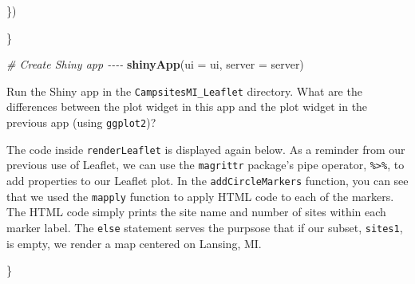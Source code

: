\documentclass[
]{krantz}
\newenvironment{Shaded}{\begin{snugshade}}{\end{snugshade}}
\newcommand{\CommentTok}[1]{\textcolor[rgb]{0.56,0.35,0.01}{\textit{#1}}}
\newcommand{\DataTypeTok}[1]{\textcolor[rgb]{0.13,0.29,0.53}{#1}}
\newcommand{\KeywordTok}[1]{\textcolor[rgb]{0.13,0.29,0.53}{\textbf{#1}}}
\newcommand{\NormalTok}[1]{#1}
\begin{document}
\begin{Shaded}
\begin{Highlighting}[]
\NormalTok{  \})}

\NormalTok{\}}

\CommentTok{\# Create Shiny app {-}{-}{-}{-}}
\KeywordTok{shinyApp}\NormalTok{(}\DataTypeTok{ui =}\NormalTok{ ui, }\DataTypeTok{server =}\NormalTok{ server)}
\end{Highlighting}
\end{Shaded}

Run the Shiny app in the \texttt{CampsitesMI\_Leaflet} directory. What are the differences between the plot widget in this app and the plot widget in the previous app (using \texttt{ggplot2})?

The code inside \texttt{renderLeaflet} is displayed again below. As a reminder from our previous use of Leaflet, we can use the \texttt{magrittr} package's pipe operator, \texttt{\%\textgreater{}\%}, to add properties to our Leaflet plot.
In the \texttt{addCircleMarkers} function, you can see that we used the \texttt{mapply} function to apply HTML code to each of the markers. The HTML code simply prints the site name and number of sites within each marker label. The \texttt{else} statement serves the purpsose that if our subset, \texttt{sites1}, is empty, we render a map centered on Lansing, MI.

\}
\end{document}
